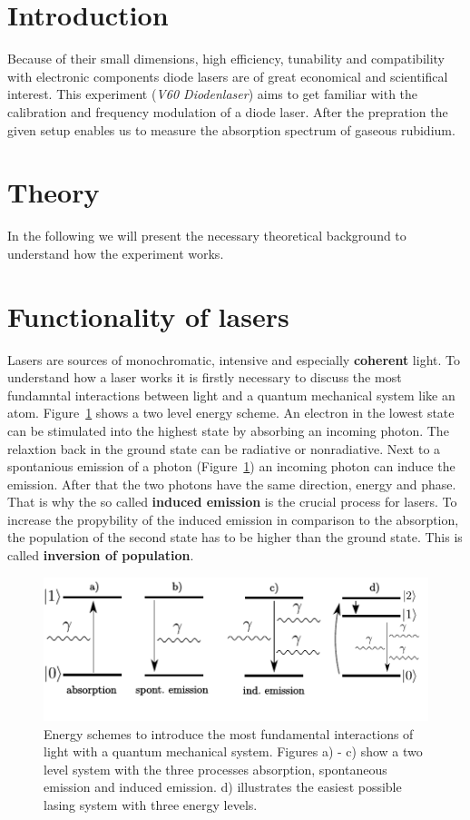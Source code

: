 \setcounter{page}{1}
\section*{Introduction}
Because of their small dimensions, high efficiency, tunability and compatibility with electronic components
diode lasers are of great economical and scientifical interest. This experiment (\emph{V60 Diodenlaser}) aims to get familiar
with the calibration and frequency modulation of a diode laser. After the prepration the given setup enables us to measure
the absorption spectrum of gaseous rubidium.

\section{Theory}
In the following we will present the necessary theoretical background to understand how the experiment works.



\section{Functionality of lasers}
Lasers are sources of monochromatic, intensive and especially \textbf{coherent} light.
To understand how a laser works it is firstly necessary to discuss the most fundamntal interactions between light and
a quantum mechanical system like an atom. Figure~\ref{fig: two_level} shows a two level energy scheme. An electron in the
lowest state can be stimulated into the highest state by absorbing an incoming photon. The relaxtion back in the
ground state can be radiative or nonradiative. Next to a spontanious emission of a photon (Figure~\ref{fig: two_level})
an incoming photon can induce the emission. After that the two photons have the same direction, energy and phase.
That is why the so called \textbf{induced emission} is the crucial process for lasers. To increase the propybility of the induced emission in
comparison to the absorption, the population of the second state has to be higher than the ground state. This is called
\textbf{inversion of population}.

\begin{figure}
  \centering
  \includegraphics[scale = 0.9]{pics/energyscheme.pdf}
  \caption{Energy schemes to introduce the most fundamental interactions of light with a quantum mechanical system. Figures a) - c) show
  a two level system with the three processes absorption, spontaneous emission and induced emission. d) illustrates the easiest possible lasing
  system with three energy levels.}
  \label{fig: two_level}
\end{figure}

